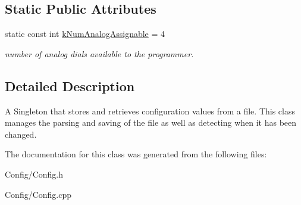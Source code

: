 \subsection*{\-Static \-Public \-Attributes}
\begin{DoxyCompactItemize}
\item 
\hypertarget{class_config_a1b3d97e9d23cfbd209a171302eb8bc82}{
static const int \hyperlink{class_config_a1b3d97e9d23cfbd209a171302eb8bc82}{k\-Num\-Analog\-Assignable} = 4}
\label{class_config_a1b3d97e9d23cfbd209a171302eb8bc82}

\begin{DoxyCompactList}\small\item\em number of analog dials available to the programmer. \end{DoxyCompactList}\end{DoxyCompactItemize}


\subsection{\-Detailed \-Description}
\-A \-Singleton that stores and retrieves configuration values from a file. \-This class manages the parsing and saving of the file as well as detecting when it has been changed. 

\-The documentation for this class was generated from the following files\-:\begin{DoxyCompactItemize}
\item 
\-Config/\-Config.\-h\item 
\-Config/\-Config.\-cpp\end{DoxyCompactItemize}
